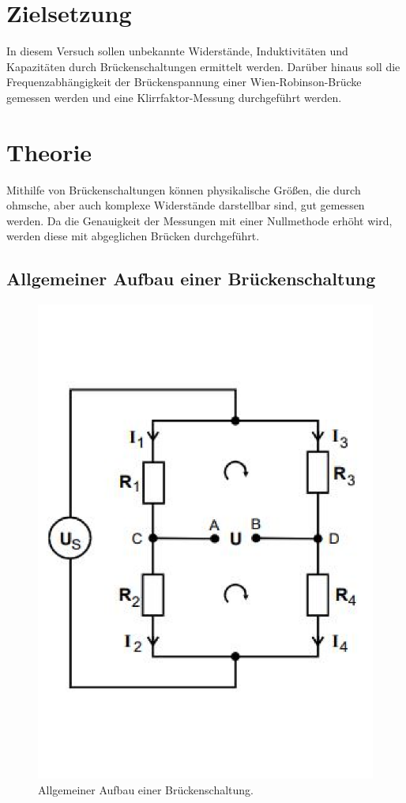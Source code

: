 \section{Zielsetzung}
\label{sec:Zielsetzung}
In diesem Versuch sollen unbekannte Widerstände, Induktivitäten und Kapazitäten durch Brückenschaltungen ermittelt werden.
Darüber hinaus soll die Frequenzabhängigkeit der Brückenspannung einer Wien-Robinson-Brücke gemessen werden und eine Klirrfaktor-Messung durchgeführt werden.
\section{Theorie}
\label{sec:Theorie}
Mithilfe von Brückenschaltungen können physikalische Größen, die durch ohmsche, aber auch komplexe Widerstände darstellbar sind, gut gemessen werden.
Da die Genauigkeit der Messungen mit einer Nullmethode erhöht wird, werden diese mit abgeglichen Brücken durchgeführt.

\subsection{Allgemeiner Aufbau einer Brückenschaltung}
\begin{figure}
    \centering
    \includegraphics[width=\textwidth]{BrückAllg.pdf}
    \caption{Allgemeiner Aufbau einer Brückenschaltung.\cite{anleitung}}
    \label{fig:Allgemein}
\end{figure}

